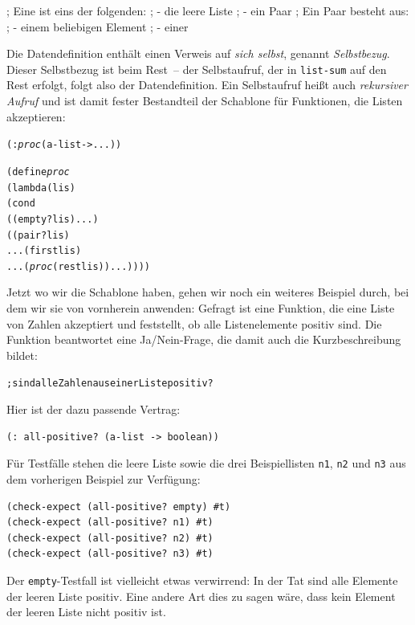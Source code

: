 \begin{pspdf}
\begin{ttfamily}\obeylines
; Eine  ist eins der folgenden:
; - die leere Liste
; - ein Paar
; Ein Paar besteht aus:
; - einem beliebigen Element
; - einer 
\end{ttfamily}
\end{pspdf}

Die Datendefinition enthält einen Verweis auf \emph{sich selbst},
genannt \emph{Selbstbezug}.  Dieser Selbstbezug ist
beim Rest~-- der Selbstaufruf, der in \texttt{list-sum} auf den Rest
erfolgt, folgt also der Datendefinition.  Ein Selbstaufruf
heißt auch \textit{rekursiver Aufruf} und ist
damit fester Bestandteil der Schablone für Funktionen, die Listen
akzeptieren:
%
\begin{alltt}
(: \textit{proc} (a-list -> ...))

(define \textit{proc}
  (lambda (lis)
    (cond
      ((empty? lis) ...)
      ((pair? lis)
       ... (first lis)
       ... (\textit{proc} (rest lis)) ...))))
\end{alltt}
%
Jetzt wo wir die Schablone haben, gehen wir noch ein weiteres Beispiel
durch, bei dem wir sie von vornherein anwenden:  Gefragt ist eine
Funktion, die eine Liste von Zahlen akzeptiert und feststellt, ob alle
Listenelemente  positiv sind.  Die Funktion beantwortet eine
Ja/Nein-Frage, die damit auch die Kurzbeschreibung bildet:
%
\begin{alltt}
; sind alle Zahlen aus einer Liste positiv?
\end{alltt}
%
Hier ist der dazu passende Vertrag:
%
\begin{verbatim}
(: all-positive? (a-list -> boolean))
\end{verbatim}
%
Für Testfälle stehen die leere Liste sowie die drei Beispiellisten
\texttt{n1}, \texttt{n2} und \texttt{n3} aus dem vorherigen Beispiel
zur Verfügung:
%
\begin{verbatim}
(check-expect (all-positive? empty) #t)
(check-expect (all-positive? n1) #t)
(check-expect (all-positive? n2) #t)
(check-expect (all-positive? n3) #t)
\end{verbatim}
%
Der \texttt{empty}-Testfall ist vielleicht etwas verwirrend: In der
Tat sind alle Elemente der leeren Liste positiv.  Eine andere Art dies
zu sagen wäre, dass kein Element der leeren Liste nicht positiv ist.

